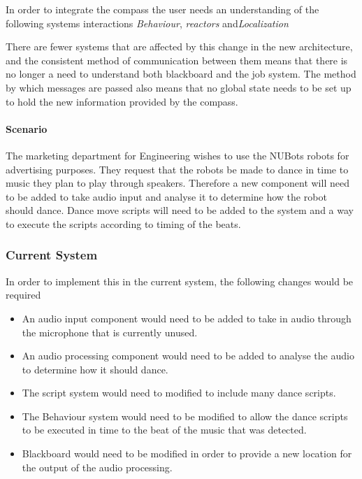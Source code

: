 \documentclass[english,12pt]{scrartcl}
\begin{document}
				In order to integrate the compass the user needs an understanding of the following systems interactions \emph{Behaviour}, \emph{\glspl{reactor}} and\emph{Localization}

				There are fewer systems that are affected by this change in the new architecture, and the consistent method of communication between them means that there is no longer a need to understand both blackboard and the job system.
				The method by which messages are passed also means that no global state needs to be set up to hold the new information provided by the compass.

			\paragraph{Scenario} The marketing department for Engineering wishes to use the NUBots robots for advertising purposes. They request that the robots be made to dance in time to music they plan to play through speakers. Therefore a new component will need to be added to take audio input and analyse it to determine how the robot should dance. Dance move scripts will need to be added to the system and a way to execute the scripts according to timing of the beats.

			\subsubsection{Current System}
				In order to implement this in the current system, the following changes would be required
				\begin{itemize}
					\item An audio input component would need to be added to take in audio through the microphone that is currently unused.
					\item An audio processing component would need to be added to analyse the audio to determine how it should dance.
					\item The script system would need to modified to include many dance scripts.
					\item The Behaviour system would need to be modified to allow the dance scripts to be executed in time to the beat of the music that was detected.
					\item Blackboard would need to be modified in order to provide a new location for the output of the audio processing.
				\end{itemize}
\end{document}
